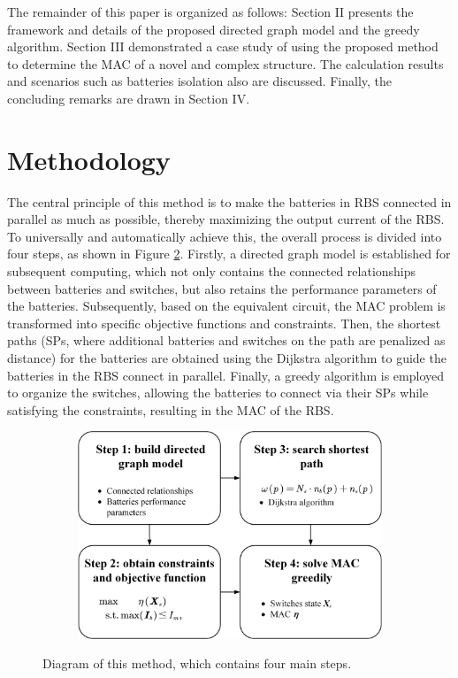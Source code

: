 \documentclass{article}
\begin{document}
The remainder of this paper is organized as follows: 
Section II presents the framework and details of the proposed directed graph model and the greedy algorithm. 
Section III demonstrated a case study of using the proposed method to determine the MAC of a novel and complex structure. 
The calculation results and scenarios such as batteries isolation also are discussed. 
Finally, the concluding remarks are drawn in Section IV.

\section{Methodology}

The central principle of this method is to make the batteries in RBS connected in parallel as much as possible, thereby maximizing the output current of the RBS.
To universally and automatically achieve this, the overall process is divided into four steps, as shown in Figure \ref{fig:main}.
Firstly, a directed graph model is established for subsequent computing, which not only contains the connected relationships between batteries and switches, but also retains the performance parameters of the batteries.
Subsequently, based on the equivalent circuit, the MAC problem is transformed into specific objective functions and constraints.
Then, the shortest paths (SPs, where additional batteries and switches on the path are penalized as distance) for the batteries are obtained using the Dijkstra algorithm to guide the batteries in the RBS connect in parallel.
Finally, a greedy algorithm is employed to organize the switches, allowing the batteries to connect via their SPs while satisfying the constraints, resulting in the MAC of the RBS.

\begin{figure}[htbp]
    \centering
    \begin{subfigure}[b]{0.8\textwidth}
        \includegraphics[width=\textwidth]{main.png}
        \caption{}
        \label{fig:main}
    \end{subfigure}
    \caption{ 
        Diagram of this method, which contains four main steps.
    }
\end{figure}
\end{document}
